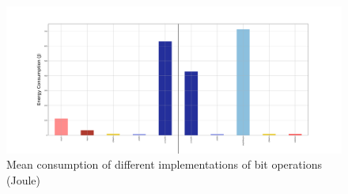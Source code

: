 \begin{figure}[thb]
    \centering
    \includegraphics[width=\linewidth]{imgs/bitopts_mean}
    \caption{Mean consumption of different implementations of bit operations (Joule) }
    \label{fig:bitops}
\end{figure}

